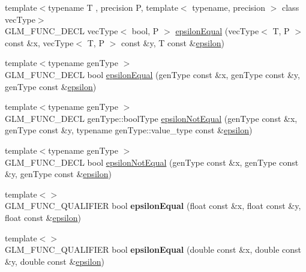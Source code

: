 \begin{DoxyCompactItemize}
\item 
{\footnotesize template$<$typename T , precision P, template$<$ typename, precision $>$ class vec\+Type$>$ }\\G\+L\+M\+\_\+\+F\+U\+N\+C\+\_\+\+D\+E\+CL vec\+Type$<$ bool, P $>$ \hyperlink{group__gtc__epsilon_gaca9443f217dc36587624247245522331}{epsilon\+Equal} (vec\+Type$<$ T, P $>$ const \&x, vec\+Type$<$ T, P $>$ const \&y, T const \&\hyperlink{group__gtc__constants_gacb41049b8d22c8aa90e362b96c524feb}{epsilon})
\item 
{\footnotesize template$<$typename gen\+Type $>$ }\\G\+L\+M\+\_\+\+F\+U\+N\+C\+\_\+\+D\+E\+CL bool \hyperlink{group__gtc__epsilon_gaa7f227999ca09e7ca994e8b35aba47bb}{epsilon\+Equal} (gen\+Type const \&x, gen\+Type const \&y, gen\+Type const \&\hyperlink{group__gtc__constants_gacb41049b8d22c8aa90e362b96c524feb}{epsilon})
\item 
{\footnotesize template$<$typename gen\+Type $>$ }\\G\+L\+M\+\_\+\+F\+U\+N\+C\+\_\+\+D\+E\+CL gen\+Type\+::bool\+Type \hyperlink{group__gtc__epsilon_ga14e2888a304654ade8a3996024e2739c}{epsilon\+Not\+Equal} (gen\+Type const \&x, gen\+Type const \&y, typename gen\+Type\+::value\+\_\+type const \&\hyperlink{group__gtc__constants_gacb41049b8d22c8aa90e362b96c524feb}{epsilon})
\item 
{\footnotesize template$<$typename gen\+Type $>$ }\\G\+L\+M\+\_\+\+F\+U\+N\+C\+\_\+\+D\+E\+CL bool \hyperlink{group__gtc__epsilon_ga50a92103fb0cbd796908e1bf20c79aaf}{epsilon\+Not\+Equal} (gen\+Type const \&x, gen\+Type const \&y, gen\+Type const \&\hyperlink{group__gtc__constants_gacb41049b8d22c8aa90e362b96c524feb}{epsilon})
\item 
{\footnotesize template$<$$>$ }\\G\+L\+M\+\_\+\+F\+U\+N\+C\+\_\+\+Q\+U\+A\+L\+I\+F\+I\+ER bool {\bfseries epsilon\+Equal} (float const \&x, float const \&y, float const \&\hyperlink{group__gtc__constants_gacb41049b8d22c8aa90e362b96c524feb}{epsilon})\hypertarget{namespaceglm_aded5e7ea9a0eacd03367ad77986c2a15}{}\label{namespaceglm_aded5e7ea9a0eacd03367ad77986c2a15}

\item 
{\footnotesize template$<$$>$ }\\G\+L\+M\+\_\+\+F\+U\+N\+C\+\_\+\+Q\+U\+A\+L\+I\+F\+I\+ER bool {\bfseries epsilon\+Equal} (double const \&x, double const \&y, double const \&\hyperlink{group__gtc__constants_gacb41049b8d22c8aa90e362b96c524feb}{epsilon})\hypertarget{namespaceglm_a6e30ea38a0e3ebc25d87e667255057e5}{}\label{namespaceglm_a6e30ea38a0e3ebc25d87e667255057e5}


\end{DoxyCompactItemize}
